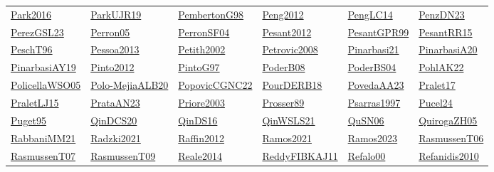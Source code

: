 \begin{longtable}{*{6}{l}}
\hyperref[detail:Park2016]{Park2016} & \hyperref[detail:ParkUJR19]{ParkUJR19} & \hyperref[detail:PembertonG98]{PembertonG98} & \hyperref[detail:Peng2012]{Peng2012} & \hyperref[detail:PengLC14]{PengLC14} & \hyperref[detail:PenzDN23]{PenzDN23}\\ 
\hyperref[detail:PerezGSL23]{PerezGSL23} & \hyperref[detail:Perron05]{Perron05} & \hyperref[detail:PerronSF04]{PerronSF04} & \hyperref[detail:Pesant2012]{Pesant2012} & \hyperref[detail:PesantGPR99]{PesantGPR99} & \hyperref[detail:PesantRR15]{PesantRR15}\\ 
\hyperref[detail:PeschT96]{PeschT96} & \hyperref[detail:Pessoa2013]{Pessoa2013} & \hyperref[detail:Petith2002]{Petith2002} & \hyperref[detail:Petrovic2008]{Petrovic2008} & \hyperref[detail:Pinarbasi21]{Pinarbasi21} & \hyperref[detail:PinarbasiA20]{PinarbasiA20}\\ 
\hyperref[detail:PinarbasiAY19]{PinarbasiAY19} & \hyperref[detail:Pinto2012]{Pinto2012} & \hyperref[detail:PintoG97]{PintoG97} & \hyperref[detail:PoderB08]{PoderB08} & \hyperref[detail:PoderBS04]{PoderBS04} & \hyperref[detail:PohlAK22]{PohlAK22}\\ 
\hyperref[detail:PolicellaWSO05]{PolicellaWSO05} & \hyperref[detail:Polo-MejiaALB20]{Polo-MejiaALB20} & \hyperref[detail:PopovicCGNC22]{PopovicCGNC22} & \hyperref[detail:PourDERB18]{PourDERB18} & \hyperref[detail:PovedaAA23]{PovedaAA23} & \hyperref[detail:Pralet17]{Pralet17}\\ 
\hyperref[detail:PraletLJ15]{PraletLJ15} & \hyperref[detail:PrataAN23]{PrataAN23} & \hyperref[detail:Priore2003]{Priore2003} & \hyperref[detail:Prosser89]{Prosser89} & \hyperref[detail:Psarras1997]{Psarras1997} & \hyperref[detail:Pucel24]{Pucel24}\\ 
\hyperref[detail:Puget95]{Puget95} & \hyperref[detail:QinDCS20]{QinDCS20} & \hyperref[detail:QinDS16]{QinDS16} & \hyperref[detail:QinWSLS21]{QinWSLS21} & \hyperref[detail:QuSN06]{QuSN06} & \hyperref[detail:QuirogaZH05]{QuirogaZH05}\\ 
\hyperref[detail:RabbaniMM21]{RabbaniMM21} & \hyperref[detail:Radzki2021]{Radzki2021} & \hyperref[detail:Raffin2012]{Raffin2012} & \hyperref[detail:Ramos2021]{Ramos2021} & \hyperref[detail:Ramos2023]{Ramos2023} & \hyperref[detail:RasmussenT06]{RasmussenT06}\\ 
\hyperref[detail:RasmussenT07]{RasmussenT07} & \hyperref[detail:RasmussenT09]{RasmussenT09} & \hyperref[detail:Reale2014]{Reale2014} & \hyperref[detail:ReddyFIBKAJ11]{ReddyFIBKAJ11} & \hyperref[detail:Refalo00]{Refalo00} & \hyperref[detail:Refanidis2010]{Refanidis2010}\\ 

\end{longtable}
